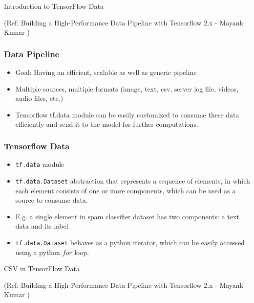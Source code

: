 \begin{frame}
  \begin{center}
    {\Large Introduction to TensorFlow Data}
	
	{\tiny (Ref: Building a High-Performance Data Pipeline with Tensorflow 2.x - Mayank Kumar )}
  \end{center}
\end{frame}

\begin{frame}[fragile]\frametitle{Data Pipeline}
\begin{itemize}
\item Goal:  Having an efficient, scalable as well as generic pipeline 
\item Multiple sources, multiple formats (image, text, csv, server log file, videos, audio files, etc.)
\item Tensorflow  tf.data module can be easily customized to consume these data efficiently and send it to the model for further computations. 
\end{itemize}
\end{frame}

\begin{frame}[fragile]\frametitle{Tensorflow Data}
\begin{itemize}
\item  \lstinline|tf.data| module
\item \lstinline|tf.data.Dataset| abstraction that represents a sequence of elements, in which each element consists of one or more components, which can be used as a source to consume data.
\item E.g. a single element in spam classifier dataset has two components: a text data and its label 
\item \lstinline|tf.data.Dataset| behaves as a python iterator, which can be easily accessed using a python $for$ loop.
\end{itemize}
\end{frame}

\begin{frame}
  \begin{center}
    {\Large CSV in TensorFlow Data}
	
	{\tiny (Ref: Building a High-Performance Data Pipeline with Tensorflow 2.x - Mayank Kumar )}
  \end{center}
\end{frame}

